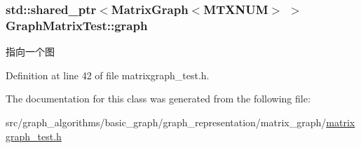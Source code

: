\subsubsection[{graph}]{\setlength{\rightskip}{0pt plus 5cm}std\+::shared\+\_\+ptr$<${\bf Matrix\+Graph}$<$M\+T\+X\+N\+U\+M$>$ $>$ Graph\+Matrix\+Test\+::graph\hspace{0.3cm}{\ttfamily [protected]}}\label{class_graph_matrix_test_a466258802e52f0a5408f78e809cd6d7c}
指向一个图 

Definition at line 42 of file matrixgraph\+\_\+test.\+h.



The documentation for this class was generated from the following file\+:\begin{DoxyCompactItemize}
\item 
src/graph\+\_\+algorithms/basic\+\_\+graph/graph\+\_\+representation/matrix\+\_\+graph/\hyperlink{matrixgraph__test_8h}{matrixgraph\+\_\+test.\+h}\end{DoxyCompactItemize}
